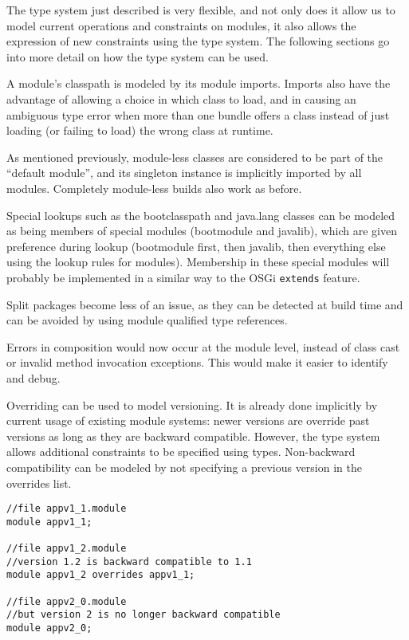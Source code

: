 The type system just described is very flexible, and not only does it
allow us to model current operations and constraints on modules, it also
allows the expression of new constraints using the type system. The following
sections go into more detail on how the type system can be used.


A module's classpath is modeled by its module imports. Imports also have the advantage
of allowing a choice in which class to load, and in causing an
ambiguous type error  when more than one bundle offers
a class instead of just loading (or failing to load) the wrong class at runtime.

As mentioned previously, module-less classes are considered to be part 
of the ``default module'', and its singleton instance is implicitly 
imported by all modules. Completely module-less builds also work as before.

Special lookups such as the bootclasspath and java.lang classes can be
modeled as being members of special modules (bootmodule and javalib), 
which are given preference during lookup (bootmodule first, then javalib,
then everything else using the lookup rules for modules). Membership
in these special modules will probably be implemented in a similar way to
the OSGi \texttt{extends} feature.

Split packages become less of an issue, as they can be detected at
build time and can be avoided by using module qualified type references.

Errors in composition would now occur at the module level, instead of
class cast or invalid method invocation exceptions. This would make it
easier to identify and debug.


Overriding can be used to model versioning. It is already done
implicitly by current usage of existing module systems: newer versions are 
override past versions as long as they are backward compatible.
However, the type system allows additional constraints to be specified using
types. Non-backward compatibility can be modeled by not specifying a
previous version in the overrides list.

\begin{lstlisting}[caption=Versioning Using Overrides]
//file appv1_1.module
module appv1_1;

//file appv1_2.module
//version 1.2 is backward compatible to 1.1
module appv1_2 overrides appv1_1;

//file appv2_0.module
//but version 2 is no longer backward compatible
module appv2_0; 
\end{lstlisting}

